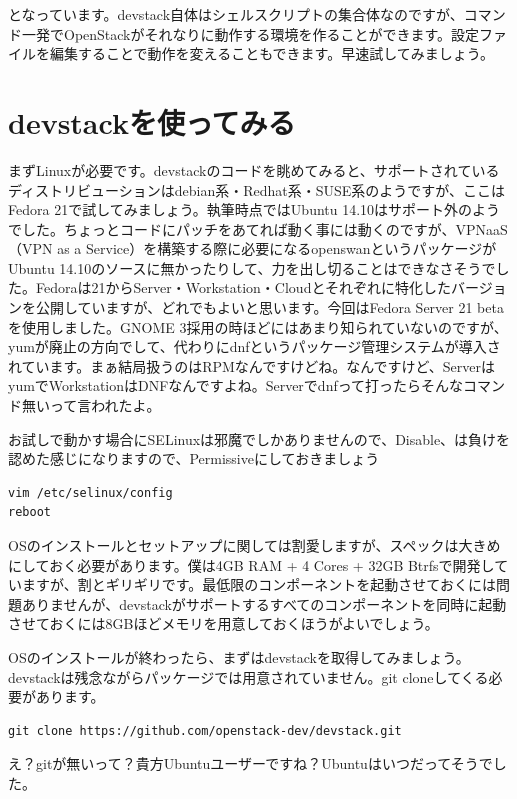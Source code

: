 \documentclass[8pt,b5paper,tombo,openany]{jsbook}
\begin{document}
となっています。devstack自体はシェルスクリプトの集合体なのですが、コマンド一発でOpenStackがそれなりに動作する環境を作ることができます。設定ファイルを編集することで動作を変えることもできます。早速試してみましょう。

\section{devstackを使ってみる}

まずLinuxが必要です。devstackのコードを眺めてみると、サポートされているディストリビューションはdebian系・Redhat系・SUSE系のようですが、ここはFedora 21で試してみましょう。執筆時点ではUbuntu 14.10はサポート外のようでした。ちょっとコードにパッチをあてれば動く事には動くのですが、VPNaaS（VPN as a Service）を構築する際に必要になるopenswanというパッケージがUbuntu 14.10のソースに無かったりして、力を出し切ることはできなさそうでした。Fedoraは21からServer・Workstation・Cloudとそれぞれに特化したバージョンを公開していますが、どれでもよいと思います。今回はFedora Server 21 betaを使用しました。GNOME 3採用の時ほどにはあまり知られていないのですが、yumが廃止の方向でして、代わりにdnfというパッケージ管理システムが導入されています。まぁ結局扱うのはRPMなんですけどね。なんですけど、ServerはyumでWorkstationはDNFなんですよね。Serverでdnfって打ったらそんなコマンド無いって言われたよ。

お試しで動かす場合にSELinuxは邪魔でしかありませんので、Disable、は負けを認めた感じになりますので、Permissiveにしておきましょう

\begin{lstlisting}
vim /etc/selinux/config
reboot
\end{lstlisting}

OSのインストールとセットアップに関しては割愛しますが、スペックは大きめにしておく必要があります。僕は4GB RAM + 4 Cores + 32GB Btrfsで開発していますが、割とギリギリです。最低限のコンポーネントを起動させておくには問題ありませんが、devstackがサポートするすべてのコンポーネントを同時に起動させておくには8GBほどメモリを用意しておくほうがよいでしょう。

OSのインストールが終わったら、まずはdevstackを取得してみましょう。devstackは残念ながらパッケージでは用意されていません。git cloneしてくる必要があります。

\begin{lstlisting}
git clone https://github.com/openstack-dev/devstack.git
\end{lstlisting}


え？gitが無いって？貴方Ubuntuユーザーですね？Ubuntuはいつだってそうでした。
\end{document}
